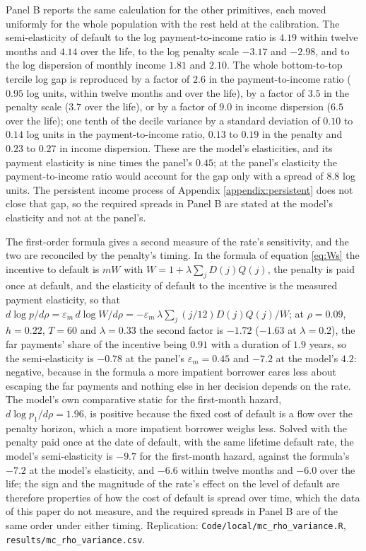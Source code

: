 \documentclass[12pt,english]{article}
\begin{document}
Panel B reports the same calculation for the other primitives, each moved uniformly for the whole population with the rest held at the calibration. The semi-elasticity of default to the log payment-to-income ratio is $4.19$ within twelve months and $4.14$ over the life, to the log penalty scale $-3.17$ and $-2.98$, and to the log dispersion of monthly income $1.81$ and $2.10$. The whole bottom-to-top tercile log gap is reproduced by a factor of $2.6$ in the payment-to-income ratio ($0.95$ log units, within twelve months and over the life), by a factor of $3.5$ in the penalty scale ($3.7$ over the life), or by a factor of $9.0$ in income dispersion ($6.5$ over the life); one tenth of the decile variance by a standard deviation of $0.10$ to $0.14$ log units in the payment-to-income ratio, $0.13$ to $0.19$ in the penalty and $0.23$ to $0.27$ in income dispersion. These are the model's elasticities, and its payment elasticity is nine times the panel's $0.45$; at the panel's elasticity the payment-to-income ratio would account for the gap only with a spread of $8.8$ log units. The persistent income process of Appendix \ref{appendix:persistent} does not close that gap, so the required spreads in Panel B are stated at the model's elasticity and not at the panel's.

The first-order formula gives a second measure of the rate's sensitivity, and the two are reconciled by the penalty's timing. In the formula of equation \eqref{eq:Ws} the incentive to default is $m W$ with $W = 1 + \lambda\sum_j D(j)Q(j)$, the penalty is paid once at default, and the elasticity of default to the incentive is the measured payment elasticity, so that $d\log p/d\rho = \varepsilon_m\, d\log W/d\rho = -\varepsilon_m\,\lambda\sum_j (j/12) D(j) Q(j)/W$; at $\rho = 0.09$, $h = 0.22$, $T = 60$ and $\lambda = 0.33$ the second factor is $-1.72$ ($-1.63$ at $\lambda = 0.2$), the far payments' share of the incentive being $0.91$ with a duration of $1.9$ years, so the semi-elasticity is $-0.78$ at the panel's $\varepsilon_m = 0.45$ and $-7.2$ at the model's $4.2$: negative, because in the formula a more impatient borrower cares less about escaping the far payments and nothing else in her decision depends on the rate. The model's own comparative static for the first-month hazard, $d\log p_1/d\rho = 1.96$, is positive because the fixed cost of default is a flow over the penalty horizon, which a more impatient borrower weighs less. Solved with the penalty paid once at the date of default, with the same lifetime default rate, the model's semi-elasticity is $-9.7$ for the first-month hazard, against the formula's $-7.2$ at the model's elasticity, and $-6.6$ within twelve months and $-6.0$ over the life; the sign and the magnitude of the rate's effect on the level of default are therefore properties of how the cost of default is spread over time, which the data of this paper do not measure, and the required spreads in Panel B are of the same order under either timing. Replication: \texttt{Code/local/mc\_rho\_variance.R}, \texttt{results/mc\_rho\_variance.csv}.
\end{document}
